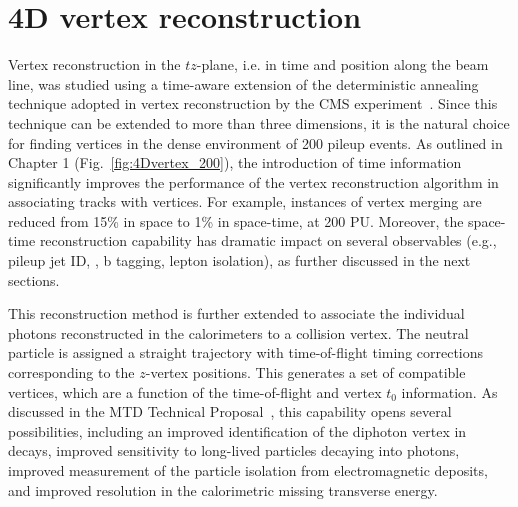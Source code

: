 \section{4D vertex reconstruction}
\label{VtxImp}

Vertex reconstruction in the $tz$-plane, i.e. in time and position along the beam line, was studied using a time-aware extension of the deterministic annealing technique adopted in vertex reconstruction by the CMS experiment~\cite{Chatrchyan:2014fea}.  Since this technique can be extended to more than three dimensions, it is the natural choice for finding vertices in the dense environment of 200 pileup events.  
As outlined in Chapter 1 (Fig.~\ref{fig:4Dvertex_200}), the
introduction of  time information significantly improves the
performance of the vertex reconstruction algorithm in associating
tracks with vertices. For example, instances of vertex merging are
reduced from 15\% in space to 1\% in space-time, at 200 PU. 
Moreover, the space-time reconstruction capability has dramatic
impact on several observables (e.g., pileup jet ID, \MET{}, b tagging,
lepton isolation), as further discussed in the next sections. 

This reconstruction method is further extended to associate the
individual photons reconstructed in the calorimeters to a collision
vertex.  The neutral particle is assigned a straight trajectory with
time-of-flight timing corrections corresponding to the $z$-vertex
positions.  This generates a set of compatible vertices, which are a
function of the time-of-flight and vertex $t_0$ information.  As
discussed in the MTD Technical Proposal~\cite{TP}, this capability
opens several possibilities, including an improved identification of
the diphoton vertex in \HGG{} decays, improved sensitivity to
long-lived particles decaying into photons, improved measurement of
the particle isolation from electromagnetic deposits, and improved
resolution in the calorimetric missing transverse energy. 

